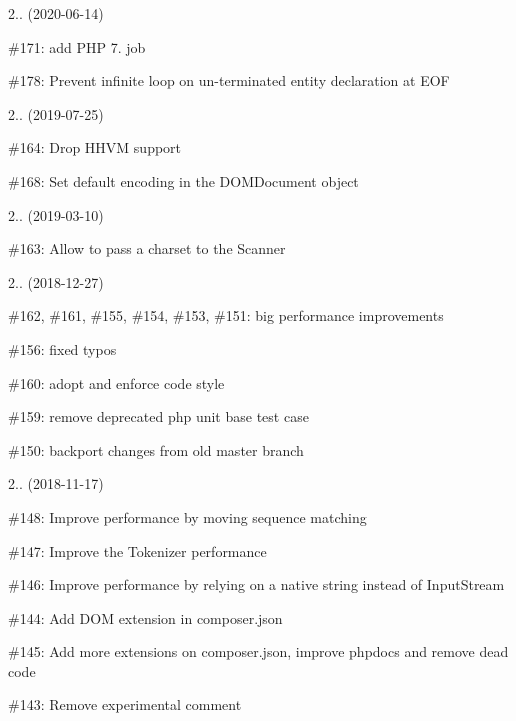 2.. (2020-\/06-\/14)


\begin{DoxyItemize}
\item \#171\+: add PHP 7. job
\item \#178\+: Prevent infinite loop on un-\/terminated entity declaration at EOF
\end{DoxyItemize}

2.. (2019-\/07-\/25)


\begin{DoxyItemize}
\item \#164\+: Drop HHVM support
\item \#168\+: Set default encoding in the DOMDocument object
\end{DoxyItemize}

2.. (2019-\/03-\/10)


\begin{DoxyItemize}
\item \#163\+: Allow to pass a charset to the Scanner
\end{DoxyItemize}

2.. (2018-\/12-\/27)


\begin{DoxyItemize}
\item \#162, \#161, \#155, \#154, \#153, \#151\+: big performance improvements
\item \#156\+: fixed typos
\item \#160\+: adopt and enforce code style
\item \#159\+: remove deprecated php unit base test case
\item \#150\+: backport changes from old master branch
\end{DoxyItemize}

2.. (2018-\/11-\/17)


\begin{DoxyItemize}
\item \#148\+: Improve performance by moving sequence matching
\item \#147\+: Improve the Tokenizer performance
\item \#146\+: Improve performance by relying on a native string instead of Input\+Stream
\item \#144\+: Add DOM extension in composer.\+json
\item \#145\+: Add more extensions on composer.\+json, improve phpdocs and remove dead code
\item \#143\+: Remove experimental comment
\end{DoxyItemize}

